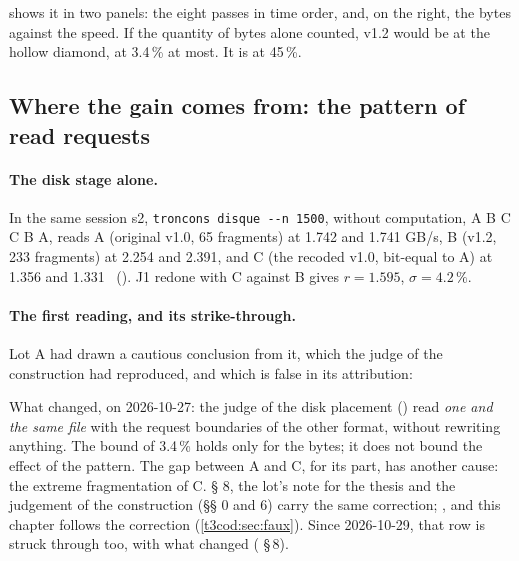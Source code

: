 shows it in two panels: the eight passes in time order, and, on the right, the bytes against the speed. If the quantity of bytes alone counted, v1.2 would be at the hollow diamond, at 3.4\,\% at most. It is at 45\,\%.

\subsection{Where the gain comes from: the pattern of read requests}\label{t3cod:sec:motif}

\paragraph{The disk stage alone.} In the same session s2, \texttt{troncons disque -{}-n 1500}, without computation, A B C C B A, reads A (original v1.0, 65 fragments) at 1.742 and 1.741 GB/s, B (v1.2, 233 fragments) at 2.254 and 2.391, and C (the recoded v1.0, bit-equal to A) at 1.356 and 1.331 \mes~(). J1 redone with C against B gives $r = 1.595$, $\sigma = 4.2\,\%$.

\paragraph{The first reading, and its strike-through.} Lot A had drawn a cautious conclusion from it, which the judge of the construction had reproduced, and which is false in its attribution:
\begin{quote}
\end{quote}
What changed, on 2026-10-27: the judge of the disk placement () read \emph{one and the same file} with the request boundaries of the other format, without rewriting anything. The bound of 3.4\,\% holds only for the bytes; it does not bound the effect of the pattern. The gap between A and C, for its part, has another cause: the extreme fragmentation of C.  § 8, the lot's note for the thesis and the judgement of the construction (§§ 0 and 6) carry the same correction; , and this chapter follows the correction (\cref{t3cod:sec:faux}). Since 2026-10-29, that row is struck through too, with what changed ( §\,8).

